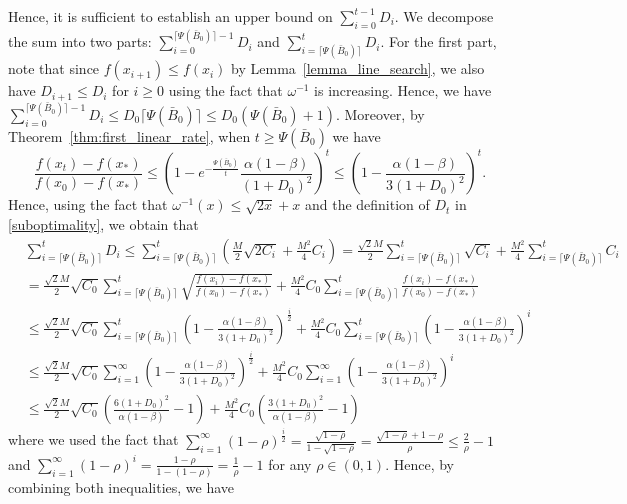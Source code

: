\documentclass[11pt,letterpaper]{article}
\newcommand\ceil[1]{\lceil #1 \rceil}
\newcommand\0{{\Vector{0}}}
\newcommand\1{{\Vector{1}}}
\numberwithin{assumption}{section}
\numberwithin{definition}{section}
\numberwithin{theorem}{section}
\numberwithin{remark}{section}
\begin{document}
    Hence, it is sufficient to establish an upper bound on $\sum_{i = 0}^{t - 1}D_i$. We decompose the sum into two parts: $\sum_{i=0}^{\ceil{\Psi(\bar{B}_0)} - 1} D_i$ and $\sum_{i = \ceil{\Psi(\bar{B}_0)}}^t D_i$. For the first part, note that since $f(x_{i + 1}) \leq f(x_i)$ by Lemma~\ref{lemma_line_search}, we also have $D_{i + 1} \leq D_i$ for $i \geq 0$ using the fact that $\omega^{-1}$ is increasing. Hence, we have $\sum_{i=0}^{\ceil{\Psi(\bar{B}_0)} - 1} D_i \leq D_0 \ceil{\Psi(\bar{B}_0)} \leq D_0 (\Psi(\bar{B}_0) + 1)$. Moreover, by Theorem~\ref{thm:first_linear_rate}, when $t \geq \Psi(\bar{{B}}_0)$ we have 
    \begin{equation*}
        \frac{f(x_t) - f(x_*)}{f(x_0) - f(x_*)} \leq \left(1 - e^{-\frac{\Psi(\bar{B}_0)}{t}}\frac{\alpha(1 - \beta)}{(1 + D_0)^2}\right)^{t} \leq \left(1 - \frac{\alpha(1 - \beta)}{3(1 + D_0)^2}\right)^{t}.
    \end{equation*}
    Hence, using the fact that $\omega^{-1}(x) \leq \sqrt{2x} + x$ and the definition of $D_t$ in \eqref{suboptimality}, we obtain that 
    \begin{align*}
        & \sum_{i=\ceil{\Psi(\bar{B}_0)}}^t D_i \leq \sum_{i=\ceil{\Psi(\bar{B}_0)}}^t (\frac{M}{2}\sqrt{2C_i} + \frac{M^2}{4}C_i ) = \frac{\sqrt{2}M}{2}\sum_{i=\ceil{\Psi(\bar{B}_0)}}^t \sqrt{C_i} + \frac{M^2}{4}\sum_{i=\ceil{\Psi(\bar{B}_0)}}^t C_i \\
        & = \frac{\sqrt{2}M}{2}\sqrt{C_0} \sum_{i=\ceil{\Psi(\bar{B}_0)}}^t \sqrt{\frac{f(x_i)-f(x_*)}{f(x_0)-f(x_*)}} + \frac{M^2}{4} C_0 \sum_{i=\ceil{\Psi(\bar{B}_0)}}^t \frac{f(x_i)-f(x_*)}{f(x_0)-f(x_*)}\\
        & \leq \frac{\sqrt{2}M}{2}\sqrt{C_0} \sum_{i=\ceil{\Psi(\bar{B}_0)}}^t \left(1 - \frac{\alpha(1 - \beta)}{3(1 + D_0)^2}\right)^{\frac{i}{2}} + \frac{M^2}{4}C_0 \sum_{i=\ceil{\Psi(\bar{B}_0)}}^t \left(1 - \frac{\alpha(1 - \beta)}{3(1 + D_0)^2}\right)^{i} \\
        & \leq \frac{\sqrt{2}M}{2}\sqrt{C_0} \sum_{i=1}^{\infty} \left(1 - \frac{\alpha(1 - \beta)}{3(1 + D_0)^2}\right)^{\frac{i}{2}} + \frac{M^2}{4}C_0 \sum_{i=1}^{\infty} \left(1 - \frac{\alpha(1 - \beta)}{3(1 + D_0)^2}\right)^{i} \\
        & \leq \frac{\sqrt{2}M}{2}\sqrt{C_0} \left(\frac{6(1 + D_0)^2}{\alpha(1 - \beta)} - 1\right) + \frac{M^2}{4}C_0 \left(\frac{3(1 + D_0)^2}{\alpha(1 - \beta)} - 1\right)
    \end{align*}
    where we used the fact that $\sum_{i=1}^{\infty}(1-\rho)^{\frac{i}{2}} = \frac{\sqrt{1-\rho}}{1-\sqrt{1-\rho}} = \frac{\sqrt{1-\rho}+1-\rho}{\rho}\leq \frac{2}{\rho}-1$ and $\sum_{i=1}^{\infty}(1-\rho)^{i} = \frac{1 - \rho}{1 - (1 - \rho)} = \frac{1}{\rho} - 1$ for any $\rho \in (0,1)$. Hence, by combining both inequalities, we have 
\end{document}
